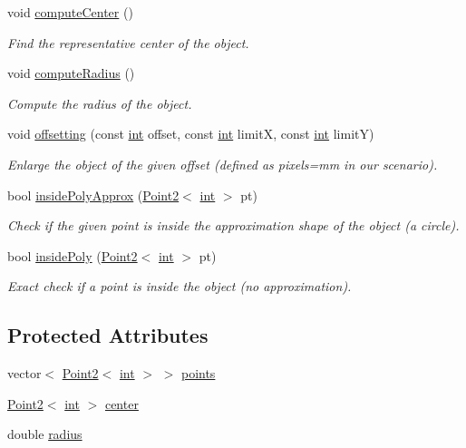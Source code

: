 \begin{DoxyCompactItemize}
void \mbox{\hyperlink{class_object_afc241f20b0055c8840f849d40d108359}{compute\+Center}} ()
\begin{DoxyCompactList}\small\item\em Find the representative center of the object. \end{DoxyCompactList}\item 
void \mbox{\hyperlink{class_object_a520dcca66f8a8075559b3a45a7a2d81a}{compute\+Radius}} ()
\begin{DoxyCompactList}\small\item\em Compute the radius of the object. \end{DoxyCompactList}\item 
void \mbox{\hyperlink{class_object_a765475eeba221a6c10ba6ed1b36aad47}{offsetting}} (const \mbox{\hyperlink{draw_8hh_aa620a13339ac3a1177c86edc549fda9b}{int}} offset, const \mbox{\hyperlink{draw_8hh_aa620a13339ac3a1177c86edc549fda9b}{int}} limitX, const \mbox{\hyperlink{draw_8hh_aa620a13339ac3a1177c86edc549fda9b}{int}} limitY)
\begin{DoxyCompactList}\small\item\em Enlarge the object of the given offset (defined as pixels=mm in our scenario). \end{DoxyCompactList}\item 
bool \mbox{\hyperlink{class_object_a5dd7d9cd5bd29176b04ab10d7577fc56}{inside\+Poly\+Approx}} (\mbox{\hyperlink{class_point2}{Point2}}$<$ \mbox{\hyperlink{draw_8hh_aa620a13339ac3a1177c86edc549fda9b}{int}} $>$ pt)
\begin{DoxyCompactList}\small\item\em Check if the given point is inside the approximation shape of the object (a circle). \end{DoxyCompactList}\item 
bool \mbox{\hyperlink{class_object_a8f54d70eb539d4ea2d05993cfd51fcc9}{inside\+Poly}} (\mbox{\hyperlink{class_point2}{Point2}}$<$ \mbox{\hyperlink{draw_8hh_aa620a13339ac3a1177c86edc549fda9b}{int}} $>$ pt)
\begin{DoxyCompactList}\small\item\em Exact check if a point is inside the object (no approximation). \end{DoxyCompactList}\end{DoxyCompactItemize}
\subsection*{Protected Attributes}
\begin{DoxyCompactItemize}
\item 
vector$<$ \mbox{\hyperlink{class_point2}{Point2}}$<$ \mbox{\hyperlink{draw_8hh_aa620a13339ac3a1177c86edc549fda9b}{int}} $>$ $>$ \mbox{\hyperlink{class_object_aeb711bf0b9c9e157b436a177bd2a80e9}{points}}
\item 
\mbox{\hyperlink{class_point2}{Point2}}$<$ \mbox{\hyperlink{draw_8hh_aa620a13339ac3a1177c86edc549fda9b}{int}} $>$ \mbox{\hyperlink{class_object_a73b61b5048f06c8d79d1cbab64d953a0}{center}}
\item 
double \mbox{\hyperlink{class_object_aacfbf5151daad699c60efc27fb702406}{radius}}
\end{DoxyCompactItemize}


